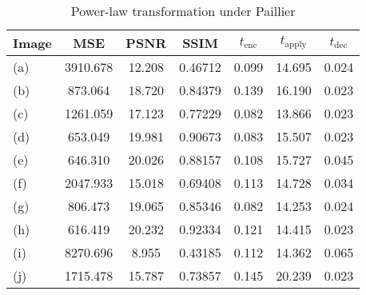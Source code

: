 \begin{table}[!ht]
	\centering
	\caption{Power-law transformation under Paillier}
	\label{tbl:pwr-pal}
    \begin{tabular}{lcccccc}
        \toprule
        Image & MSE  & PSNR & SSIM & $t_\text{enc}$ & $t_\text{apply}$ & $t_\text{dec}$ \\ \midrule
        (a) & 3910.678 & 12.208 & 0.46712 & 0.099 & 14.695 & 0.024 \\
		(b) & 873.064 & 18.720 & 0.84379 & 0.139 & 16.190 & 0.023 \\
		(c) & 1261.059 & 17.123 & 0.77229 & 0.082 & 13.866 & 0.023 \\
		(d) & 653.049 & 19.981 & 0.90673 & 0.083 & 15.507 & 0.023 \\
		(e) & 646.310 & 20.026 & 0.88157 & 0.108 & 15.727 & 0.045 \\
		(f) & 2047.933 & 15.018 & 0.69408 & 0.113 & 14.728 & 0.034 \\
		(g) & 806.473 & 19.065 & 0.85346 & 0.082 & 14.253 & 0.024 \\
		(h) & 616.419 & 20.232 & 0.92334 & 0.121 & 14.415 & 0.023 \\
		(i) & 8270.696 & 8.955 & 0.43185 & 0.112 & 14.362 & 0.065 \\
		(j) & 1715.478 & 15.787 & 0.73857 & 0.145 & 20.239 & 0.023 \\
		\bottomrule
        \end{tabular}
\end{table}


